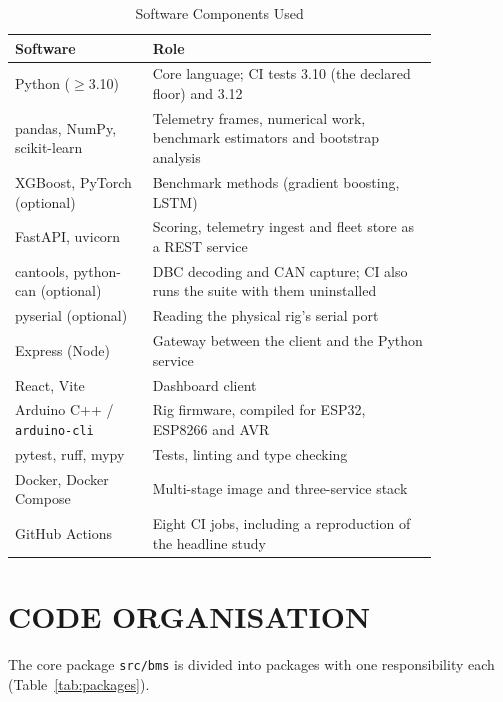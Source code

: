 \documentclass[12pt,a4paper]{amritareport}
\begin{document}
\begin{table}[htbp]
	\caption{Software Components Used}
	\centering
	\small
	\renewcommand{\arraystretch}{1.15}
	\setlength{\tabcolsep}{4pt}
	\begin{tabular}{|L{0.27\linewidth}|L{0.57\linewidth}|}
		\hline
		\textbf{Software} & \textbf{Role} \\
		\hline
		Python ($\ge$3.10) & Core language; CI tests 3.10 (the declared floor) and 3.12 \\
		\hline
		pandas, NumPy, scikit-learn & Telemetry frames, numerical work, benchmark estimators and bootstrap analysis \\
		\hline
		XGBoost, PyTorch (optional) & Benchmark methods (gradient boosting, LSTM) \\
		\hline
		FastAPI, uvicorn & Scoring, telemetry ingest and fleet store as a REST service \\
		\hline
		cantools, python-can (optional) & DBC decoding and CAN capture; CI also runs the suite with them uninstalled \\
		\hline
		pyserial (optional) & Reading the physical rig's serial port \\
		\hline
		Express (Node) & Gateway between the client and the Python service \\
		\hline
		React, Vite & Dashboard client \\
		\hline
		Arduino C++ / \texttt{arduino-cli} & Rig firmware, compiled for ESP32, ESP8266 and AVR \\
		\hline
		pytest, ruff, mypy & Tests, linting and type checking \\
		\hline
		Docker, Docker Compose & Multi-stage image and three-service stack \\
		\hline
		GitHub Actions & Eight CI jobs, including a reproduction of the headline study \\
		\hline
	\end{tabular}
	\label{tab:software}
\end{table}

\section{CODE ORGANISATION}
\label{sec:impl-org}

The core package \texttt{src/bms} is divided into packages with one responsibility each (Table~\ref{tab:packages}).
\end{document}
